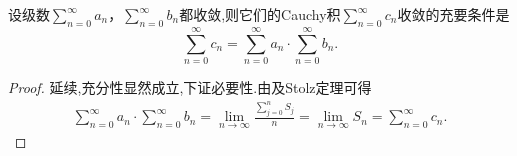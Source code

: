 \documentclass[../../main.tex]{subfiles}
\begin{document}
\begin{corollary}\label{corollary:收敛级数Cauchy积收敛则就等于级数积}
设级数\(\sum_{n = 0}^{\infty} a_n\)，\(\sum_{n = 0}^{\infty} b_n\)都收敛,则它们的Cauchy积\(\sum_{n = 0}^{\infty} c_n\)收敛的充要条件是
\[
\sum_{n = 0}^{\infty} c_n = \sum_{n = 0}^{\infty} a_n \cdot \sum_{n = 0}^{\infty} b_n. 
\]
\end{corollary}
\begin{proof}
延续,充分性显然成立,下证必要性.由及Stolz定理可得
\begin{align*}
\sum_{n=0}^{\infty}{a_n}\cdot \sum_{n=0}^{\infty}{b_n}=\lim_{n\rightarrow \infty} \frac{\sum\limits_{j=0}^n{S_j}}{n}=\lim_{n\rightarrow \infty} S_n=\sum_{n=0}^{\infty}{c_n}.
\end{align*}

\end{proof}
\end{document}
